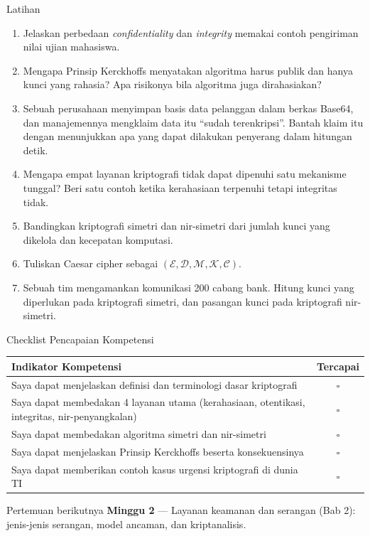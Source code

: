 \documentclass[aspectratio=169,11pt]{beamer}
\begin{document}
\begin{frame}{Latihan}
    \footnotesize
    \begin{enumerate}
        \item Jelaskan perbedaan \textit{confidentiality} dan \textit{integrity}
              memakai contoh pengiriman nilai ujian mahasiswa.
        \item Mengapa Prinsip Kerckhoffs menyatakan algoritma harus publik dan
              hanya kunci yang rahasia? Apa risikonya bila algoritma juga
              dirahasiakan?
        \item Sebuah perusahaan menyimpan basis data pelanggan dalam berkas
              Base64, dan manajemennya mengklaim data itu ``sudah terenkripsi''.
              Bantah klaim itu dengan menunjukkan apa yang dapat dilakukan
              penyerang dalam hitungan detik.
        \item Mengapa empat layanan kriptografi tidak dapat dipenuhi satu
              mekanisme tunggal? Beri satu contoh ketika kerahasiaan terpenuhi
              tetapi integritas tidak.
        \item Bandingkan kriptografi simetri dan nir-simetri dari jumlah kunci
              yang dikelola dan kecepatan komputasi.
        \item Tuliskan Caesar cipher sebagai
              $(\mathcal{E},\mathcal{D},\mathcal{M},\mathcal{K},\mathcal{C})$.
        \item Sebuah tim mengamankan komunikasi 200 cabang bank. Hitung kunci yang
              diperlukan pada kriptografi simetri, dan pasangan kunci pada
              kriptografi nir-simetri.
    \end{enumerate}
\end{frame}

\begin{frame}{Checklist Pencapaian Kompetensi}
    \footnotesize
    \begin{tabularx}{\linewidth}{@{}X c@{}}
        \toprule
        Indikator Kompetensi & Tercapai \\
        \midrule
        Saya dapat menjelaskan definisi dan terminologi dasar kriptografi & $\square$ \\
        \hline
        Saya dapat membedakan 4 layanan utama (kerahasiaan, otentikasi, integritas, nir-penyangkalan) & $\square$ \\
        \hline
        Saya dapat membedakan algoritma simetri dan nir-simetri & $\square$ \\
        \hline
        Saya dapat menjelaskan Prinsip Kerckhoffs beserta konsekuensinya & $\square$ \\
        \hline
        Saya dapat memberikan contoh kasus urgensi kriptografi di dunia TI & $\square$ \\
        \bottomrule
    \end{tabularx}
    \vspace{0.35cm}
    \begin{block}{Pertemuan berikutnya}
        \textbf{Minggu 2} --- Layanan keamanan dan serangan
        (Bab 2): jenis-jenis serangan, model ancaman, dan kriptanalisis.
    \end{block}
\end{frame}
\end{document}
